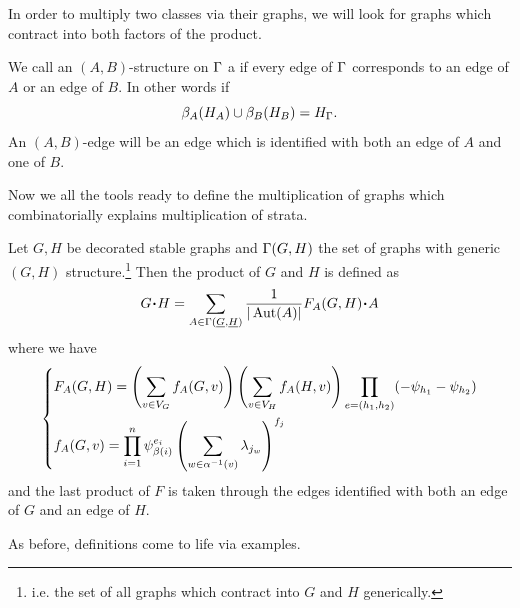 \documentclass[12pt]{memoir}
\begin{document}
In order to multiply two classes via their graphs, we will look for graphs which contract into both factors of the product. 

\begin{Def}
    We call an $(A,B)$-structure on $\Gamma$ a  if every edge of $\Gamma$ corresponds to an edge of $A$ or an edge of $B$. In other words if 
    $$\beta_A(H_A)\cup\beta_B(H_B)=H_\Gamma.$$
    An $(A,B)$-edge will be an edge which is identified with both an edge of $A$ and one of $B$.
\end{Def}

Now we all the tools ready to define the multiplication of graphs which combinatorially explains multiplication of strata.

\begin{Def}
    Let $G,H$ be decorated stable graphs and $\Gamma(G,H)$ the set of graphs with generic $(G,H)$ structure.\footnote{i.e. the set of all graphs which contract into $G$ and $H$ generically.} Then the product of $G$ and $H$ is defined as 
    $$G\. H=\sum_{A\in\Ga(\un G,\un H)}\frac{1}{|\Aut(A)|}F_A(G,H)\.A$$
    where we have 
    $$
    \left\lbrace
    \begin{aligned}
        &F_A(G,H)=\left(\sum_{v\in V_G}f_A(G,v)\right)\left(\sum_{v\in V_H}f_A(H,v)\right)\prod_{e=(h_1,h_2)}(-\psi_{h_1}-\psi_{h_2})\\
        &f_A(G,v)=\prod_{i=1}^{n}\psi_{\beta(i)}^{e_i}\left(\sum_{w\in\alpha^{-1}(v)}\lambda_{j_w}\right)^{f_j}
    \end{aligned}
    \right.
    $$
    and the last product of $F$ is taken through the edges identified with both an edge of $G$ and an edge of $H$.
\end{Def}

As before, definitions come to life via examples. 
\end{document}
